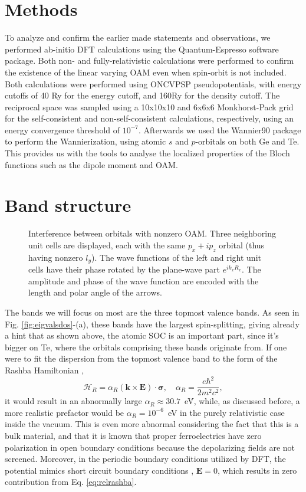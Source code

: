 \section{Methods}
To analyze and confirm the earlier made statements and observations, we performed ab-initio DFT calculations using the Quantum-Espresso software package\cite{Giannozzi2009}. Both non- and fully-relativistic calculations were performed to confirm the existence of the linear varying OAM even when spin-orbit is not included. Both calculations were performed using ONCVPSP pseudopotentials, with energy cutoffs of 40 Ry for the energy cutoff, and 160Ry for the density cutoff. The reciprocal space was sampled using a 10x10x10 and 6x6x6 Monkhorst-Pack grid for the self-consistent and non-self-consistent calculations, respectively, using an energy convergence threshold of $10^{-7}$. Afterwards we used the Wannier90 \cite{Mostofi2014AnFunctions} package to perform the Wannierization, using atomic $s$ and $p$-orbitals on both Ge and Te. This provides us with the tools to analyse the localized properties of the Bloch functions such as the dipole moment and OAM. 

\section{Band structure}
\begin{figure}[b!]
\caption{\label{fig:interference}Interference between orbitals with nonzero OAM. Three neighboring unit cells are displayed, each with the same $p_x + ip_z$ orbital (thus having nonzero $l_y$). The wave functions of the left and right unit cells have their phase rotated by the plane-wave part $e^{i k_x R_x}$. The amplitude and phase of the wave function are encoded with the length and polar angle of the arrows.}
\end{figure}
The bands we will focus on most are the three topmost valence bands. As seen in Fig. \ref{fig:eigvalsdos}-(a), these bands have the largest spin-splitting, giving already a hint that as shown above, the atomic SOC is an important part, since it's bigger on Te, where the orbitals comprising these bands originate from. If one were to fit the dispersion from the topmost valence band to the form of the Rashba Hamiltonian \cite{Rashba1959SymmetryAr, Lifshitz1982CourseTheory},
\begin{equation}\label{eq:relrashba}
\mathcal{H}_R=\alpha_R (\bm{k} \times \bm{E})\cdot \bm{\sigma}, \quad \alpha_R=\frac{e\hbar^2}{2m^2c^2},
\end{equation}
it would result in an abnormally large $\alpha_R\approx 30.7$~eV\.\angstrom \cite{DiSante2013}, while, as discussed before, a more realistic prefactor would be $\alpha_R=10^{-6}$~eV in the purely relativistic case inside the vacuum. This is even more abnormal considering the fact that this is a bulk material, and that it is known that proper ferroelectrics have zero polarization in open boundary conditions because the depolarizing fields are not screened. Moreover, in the periodic boundary conditions utilized by DFT, the potential mimics short circuit boundary conditions \cite{Meyer2008AbFields}, $\bm E=0$, which results in zero contribution from Eq. \ref{eq:relrashba}. 

